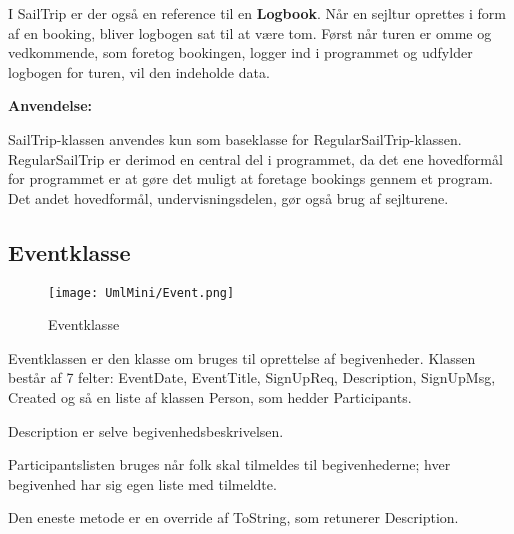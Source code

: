 I SailTrip er der også en reference til en \textbf{Logbook}.
Når en sejltur oprettes i form af en booking, bliver logbogen sat til at være tom.
Først når turen er omme og vedkommende, som foretog bookingen, logger ind i programmet og udfylder logbogen for turen, vil den indeholde data.

\textbf{Anvendelse:}

SailTrip-klassen anvendes kun som baseklasse for RegularSailTrip-klassen. 
RegularSailTrip er derimod en central del i programmet, da det ene hovedformål for programmet er at gøre det muligt at foretage bookings gennem et program. Det andet hovedformål, undervisningsdelen, gør også brug af sejlturene. 

\subsection{Eventklasse}

\begin{wrapfigure}{l}{0.5\textwidth}
    \label{img:login_interface}
    \vspace{-20pt}
    \begin{center}
        \texttt{[image: UmlMini/Event.png]}
    \end{center}
    \vspace{-20pt}
    \caption{Eventklasse}
    \vspace{-10pt}
\end{wrapfigure}
Eventklassen er den klasse om bruges til oprettelse af  begivenheder. Klassen består af 7 felter: EventDate, EventTitle, SignUpReq, Description, SignUpMsg, Created og så en liste af klassen Person, som hedder Participants.

Description er selve begivenhedsbeskrivelsen. 

Participantslisten bruges når folk skal tilmeldes til begivenhederne; hver begivenhed har sig egen liste med tilmeldte. 

Den eneste metode er en override af ToString, som retunerer Description.

